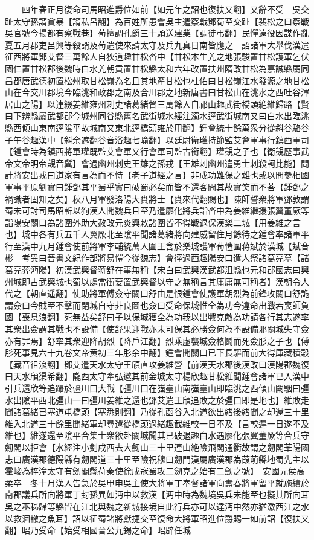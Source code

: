 　　四年春正月復命司馬昭進爵位如前【如元年之詔也復扶又翻】又辭不受　吳交趾太守孫諝貪暴【諝私呂翻】為百姓所患會吳主遣察戰鄧荀至交趾【裴松之曰察戰吳官號今揚都有察戰巷】荀擅調孔爵三十頭送建業【調徒弔翻】民憚遠役因謀作亂夏五月郡吏呂興等殺諝及荀遣使來請太守及兵九真日南皆應之　詔諸軍大舉伐漢遣征西將軍鄧艾督三萬餘人自狄道趣甘松沓中【甘松本生羌之地張駿置甘松護軍乞伏國仁置甘松郡後魏時白水羌朝貢置甘松縣太和六年改置扶州隋改甘松為嘉誠縣屬同昌郡唐武德初置松州取甘松嶺為名且其地產甘松也杜佑曰甘松嶺江水發源之地甘松山在今交川郡境今臨洮和政郡之南及合川郡之地新唐書曰甘松山在洮水之西吐谷渾居山之陽】以連綴姜維雍州刺史諸葛緒督三萬餘人自祁山趣武街橋頭絶維歸路【賢曰下辨縣屬武都郡今城州同谷縣舊名武街城水經注濁水逕武街城南又曰白水出臨洮縣西傾山東南逕隂平故城南又東北逕橋頭雍於用翻】鍾會統十餘萬衆分從斜谷駱谷子午谷趣漢中【斜余遮翻谷音浴趣七喻翻】以廷尉衛瓘持節監艾會軍事行鎮西軍司【鍾會時為鎮西將軍瓘既監艾會軍又行會軍司監古銜翻】瓘覬之子也【衛覬歷事武帝文帝明帝覬音冀】會過幽州刺史王雄之孫戎【王雄刺幽州遣勇士刺殺軻比能】問計將安出戎曰道家有言為而不恃【老子道經之言】非成功難保之難也或以問參相國軍事平原劉實曰鍾鄧其平蜀乎實曰破蜀必矣而皆不還客問其故實笑而不荅【鍾鄧之禍識者固知之矣】秋八月軍發洛陽大賚將士【賚來代翻賜也】陳師誓衆將軍鄧敦謂蜀未可討司馬昭斬以狥漢人聞魏兵且至乃遣廖化將兵詣沓中為姜維繼援張翼董厥等詣陽安關口為諸圍外助大赦改元炎興敕諸圍皆不得戰退保漢樂二城【用姜維之言也】城中各有兵五千人翼厥北至隂平聞諸葛緒將向建威留住月餘待之鍾會率諸軍平行至漢中九月鍾會使前將軍李輔統萬人圍王含於樂城護軍荀愷圍蒋斌於漢城【斌音彬　考異曰晉書文紀作部將易愷今從魏志】會徑過西趣陽安口遣人祭諸葛亮墓【諸葛亮葬沔陽】初漢武興督蒋舒在事無稱【宋白曰武興漢武都沮縣也元和郡國志曰興州城即古武興城也蜀以處當衝要置武興督以守之無稱言其庸庸無可稱者】漢朝令人代之【朝直遥翻】使助將軍傅僉守關口舒由是恨鍾會使護軍胡烈為前鋒攻關口舒詭謂僉曰今賊至不擊而閉城自守非良圖也僉曰受命保城惟全為功今違命出戰若喪師負國【喪息浪翻】死無益矣舒曰子以保城獲全為功我以出戰克敵為功請各行其志遂率其衆出僉謂其戰也不設備【使舒果迎戰亦未可保其必勝僉何為不設備邪關城失守僉亦有罪焉】舒率其衆迎降胡烈【降戶江翻】烈乘虚襲城僉格鬬而死僉肜之子也【傅肜死事見六十九卷文帝黄初三年肜余中翻】鍾會聞關口已下長驅而前大得庫藏積穀【藏音徂浪翻】鄧艾遣天水太守王頎直攻姜維營【前漢天水郡後漢改曰漢陽郡魏復曰天水頎渠希翻】隴西太守牽弘邀其前金城太守楊欣趣甘松維聞鍾會諸軍已入漢中引兵還欣等追躡於疆川口大戰【彊川口在嵹臺山南嵹臺山即臨洮之西傾山闕駰曰彊水出隂平西北彊山一曰彊川姜維之還也鄧艾遣王頎追敗之於彊口即是地也】維敗走聞諸葛緒已塞道屯橋頭【塞悉則翻】乃從孔函谷入北道欲出緒後緒聞之却還三十里維入北道三十餘里聞緒軍却尋還從橋頭過緒趣截維較一日不及【言較遲一日遂不及維也】維遂還至隂平合集士衆欲赴關城聞其已破退趣白水遇廖化張翼董厥等合兵守劒閣以拒會【水經注小劍戍西去大劒山三十里連山絶險飛閣通衢故謂之劒閣華陽國志曰廣漢郡德陽縣有劒閣道三十里至險祝穆曰劒門漢屬廣漢郡為葭萌縣地蜀先主以霍峻為梓潼太守有劒閣縣苻秦使徐成宼蜀攻二劒克之始有二劒之號】　安國元侯高柔卒　冬十月漢人告急於吳甲申吳主使大將軍丁奉督諸軍向夀春將軍留平就施績於南郡議兵所向將軍丁封孫異如沔中以救漢【沔中時為魏境吳兵未能至也擬其所向耳吳之巫秭歸等縣皆在江北與魏之新城接境自此行兵亦可以達沔中然亦猶激西江之水以救涸轍之魚耳】詔以征蜀諸將獻捷交至復命大將軍昭進位爵賜一如前詔【復扶又翻】昭乃受命【始受相國晉公九錫之命】昭辟任城